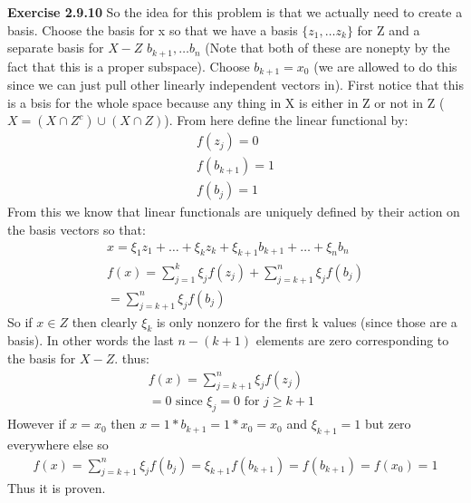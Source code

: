 \documentclass[12pt]{article}
\newenvironment{exercise}[1]{\vspace{.1in}\noindent\textbf{Exercise #1 \hspace{.05em}}}{}
\theoremstyle{definition}
\theoremstyle{remark}
\begin{document}
\begin{exercise}{2.9.10}
	So the idea for this problem is that we actually need to create a basis. Choose the basis for x so that we have a basis $\{z_1,\dots z_k\}$ for Z and a separate basis for $X-Z$ $b_{k+1},\dots b_n$ (Note that both of these are nonepty by the fact that this is a proper subspace). Choose $b_{k+1}=x_0$ (we are allowed to do this since we can just pull other linearly independent vectors in). First notice that this is a bsis for the whole space because any thing in X is either in Z or not in Z ($X=(X\cap Z^c)\cup (X\cap Z)$). From here define the linear functional by:
	\begin{align}
		f(z_j)=0     \\
		f(b_{k+1})=1 \\
		f(b_{j})=1
	\end{align}
	From this we know that linear functionals are uniquely defined by their action on the basis vectors so that:
	\begin{align}
		x=\xi_1z_1+\dots+\xi_kz_k+\xi_{k+1}b_{k+1}+\dots+\xi_nb_n \\
		f(x)=\sum_{j=1}^k\xi_jf(z_j)+\sum_{j=k+1}^n\xi_jf(b_j)    \\
		=\sum_{j=k+1}^n\xi_jf(b_j)
	\end{align}
	So if $x\in Z$ then clearly $\xi_k$ is only nonzero for the first k values (since those are a basis). In other words the last $n-(k+1)$ elements are zero corresponding to the basis for $X-Z$. thus:
	\begin{align}
		f(x)=\sum_{j=k+1}^n\xi_jf(z_j) \\
		=0 \text{ since $\xi_j=0$ for $j\geq k+1$ }
	\end{align}
	However if $x=x_0$ then $x=1*b_{k+1}=1*x_0=x_0$ and $\xi_{k+1}=1$ but zero everywhere else so
	\begin{align}
		f(x)=\sum_{j=k+1}^n\xi_jf(b_j)=\xi_{k+1}f(b_{k+1})=f(b_{k+1})=f(x_0)=1
	\end{align}
	Thus it is proven.

\end{exercise}
\end{document}
